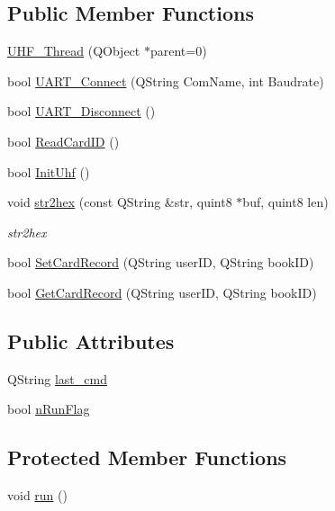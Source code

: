 \subsection*{Public Member Functions}
\begin{DoxyCompactItemize}
\item 
\mbox{\hyperlink{class_u_h_f___thread_a4e345d08f3f78642458925017371cac2}{U\+H\+F\+\_\+\+Thread}} (Q\+Object $\ast$parent=0)
\item 
bool \mbox{\hyperlink{class_u_h_f___thread_a8a872370902a9eb489a836ab28d8044c}{U\+A\+R\+T\+\_\+\+Connect}} (Q\+String Com\+Name, int Baudrate)
\item 
bool \mbox{\hyperlink{class_u_h_f___thread_a4d29770cacd38ec97148b8642df794b8}{U\+A\+R\+T\+\_\+\+Disconnect}} ()
\item 
bool \mbox{\hyperlink{class_u_h_f___thread_a6dcb8fe026e47d35c7d992b860c86492}{Read\+Card\+ID}} ()
\item 
bool \mbox{\hyperlink{class_u_h_f___thread_a0bb3c8d9ac1290986ce318819dc4ecbf}{Init\+Uhf}} ()
\item 
void \mbox{\hyperlink{class_u_h_f___thread_aa7aa23919d844f6da517ecec5747bed5}{str2hex}} (const Q\+String \&str, quint8 $\ast$buf, quint8 len)
\begin{DoxyCompactList}\small\item\em str2hex \end{DoxyCompactList}\item 
bool \mbox{\hyperlink{class_u_h_f___thread_a1ec4510fd4d722b34d6cd33c3820f897}{Set\+Card\+Record}} (Q\+String user\+ID, Q\+String book\+ID)
\item 
bool \mbox{\hyperlink{class_u_h_f___thread_af1bc225a4a6a68a1dd79eb7d8688648d}{Get\+Card\+Record}} (Q\+String user\+ID, Q\+String book\+ID)
\end{DoxyCompactItemize}
\subsection*{Public Attributes}
\begin{DoxyCompactItemize}
\item 
Q\+String \mbox{\hyperlink{class_u_h_f___thread_a04164c9431f66a3e25ea1206ac1b1adc}{last\+\_\+cmd}}
\item 
bool \mbox{\hyperlink{class_u_h_f___thread_ab40811b93c5e8b31c4f40cc79139e504}{n\+Run\+Flag}}
\end{DoxyCompactItemize}
\subsection*{Protected Member Functions}
\begin{DoxyCompactItemize}
\item 
void \mbox{\hyperlink{class_u_h_f___thread_a7ae2a5c0bae9b20e0fbc315febefb818}{run}} ()
\end{DoxyCompactItemize}
